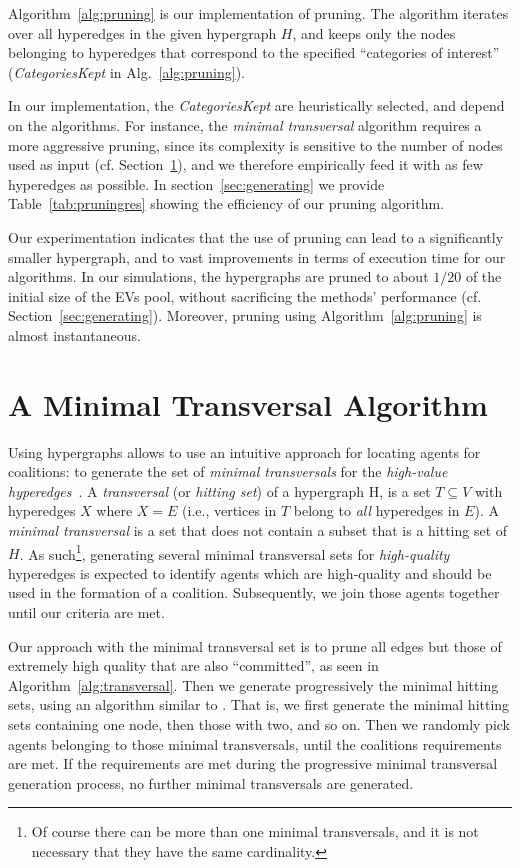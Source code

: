 Algorithm~\ref{alg:pruning} is our implementation of pruning. The algorithm iterates over all hyperedges in the given hypergraph $H$, and 
keeps only the nodes belonging to hyperedges that correspond to the specified ``categories of interest'' ({\em CategoriesKept} in Alg.~\ref{alg:pruning}).

In our implementation, the {\em CategoriesKept} are heuristically selected, and depend on the algorithms. For instance, the {\em minimal transversal} algorithm requires a more aggressive pruning, since its complexity is sensitive to the number of nodes used as input (cf. Section~\ref{sec:transversal}), and we therefore empirically feed it with as few hyperedges as possible. 
In section~\ref{sec:generating} we provide Table~\ref{tab:pruningres} showing the efficiency of our pruning algorithm.

Our experimentation indicates that the use of pruning can lead to a significantly smaller hypergraph, and to vast improvements in terms of execution time for our algorithms.  In our simulations, the hypergraphs are pruned to about $1/20$ of the initial size of the EVs pool, without sacrificing the methods' performance (cf. Section~\ref{sec:generating}). Moreover, pruning using Algorithm~\ref{alg:pruning} is almost instantaneous.

\section{A Minimal Transversal Algorithm} \label{sec:transversal}
Using hypergraphs allows to use an intuitive approach  for locating agents for coalitions: to generate the set of \textit{minimal transversals} for the \textit{high-value hyperedges}~\cite{eiter1995identifying}. A \textit{transversal} (or \textit{hitting set}) of a hypergraph H, is a set $T\subseteq V$ with hyperedges $X$ where $X = E$ (i.e., vertices in $T$ belong to \textit{all} hyperedges in $E$). A \textit{minimal transversal} is a set that does not contain a subset that is a hitting set of $H$.  As such\footnote{Of course there can be more than one minimal transversals, and it is not necessary that they have the same cardinality.}, generating several minimal transversal sets for \textit{high-quality} hyperedges is expected to identify agents which are high-quality and should be used in the formation of a coalition. Subsequently, we join those agents together until our criteria are met. 

Our approach with the minimal transversal set is to prune all edges but those of extremely high quality that are also ``committed'', as seen in Algorithm~\ref{alg:transversal}. Then we generate progressively the minimal hitting sets, using an algorithm similar to \cite{eiter1995identifying}. That is, we first generate the minimal hitting sets containing one node, then those with two, and so on. Then we randomly pick agents belonging to those minimal transversals, until the coalitions requirements are met. If the requirements are met during the progressive minimal transversal generation process, no further minimal transversals are generated.


